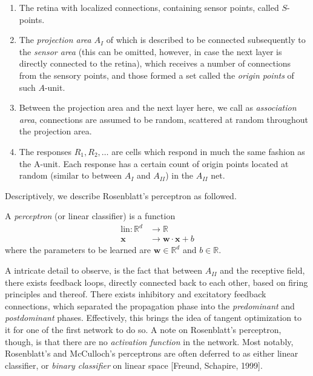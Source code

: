 \begin{enumerate}
  \item The retina with localized connections, containing sensor points, called $S$-points. 
  \item The \textit{projection area} $A_{I}$ of which is described to be connected subsequently to the \textit{sensor area} (this can be omitted, however, in case the next layer is directly connected to the retina), which receives a number of connections from the sensory points, and those formed a set called the \textit{origin points} of such $A$-unit. 
  \item Between the projection area and the next layer here, we call as \textit{association area}, connections are assumed to be random, scattered at random throughout the projection area. 
  \item The responses $R_1, R_2, \dots$ are cells which respond in much the same fashion as the A-unit. Each response has a certain count of origin points located at random (similar to between $A_I$ and $A_{II}$) in the $A_{II}$ net. 
\end{enumerate}

Descriptively, we describe Rosenblatt's perceptron as followed.
\begin{definition}[Rosenblatt, 1957]
  A \textit{perceptron} (or linear classifier) is a function \begin{equation}
    \begin{split}
      \mathrm{lin}: \mathbb{R}^{d} & \to \mathbb{R}\\
      \mathbf{x} & \to \mathbf{w}\cdot \mathbf{x} + b 
    \end{split}
  \end{equation}
  where the parameters to be learned are $\mathbf{w}\in\mathbb{R}^{d}$ and $b\in\mathbb{R}$. 
\end{definition}

A intricate detail to observe, is the fact that between $A_{II}$ and the receptive field, there exists feedback loops, directly connected back to each other, based on firing principles and thereof. There exists inhibitory and excitatory feedback connections, which separated the propagation phase into the \textit{predominant} and \textit{postdominant} phases. Effectively, this brings the idea of tangent optimization to it for one of the first network to do so. A note on Rosenblatt's perceptron, though, is that there are no \textit{activation function} in the network. Most notably, Rosenblatt's and McCulloch's perceptrons are often deferred to as either linear classifier, or \textit{binary classifier} on linear space [Freund, Schapire, 1999]. 

